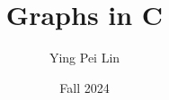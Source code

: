 \documentclass[a4paper,11pt]{article}
\begin{document}
\title{
  \textbf{Graphs in C}
}
\author{Ying Pei Lin}
\date{Fall 2024}

\maketitle

\subsection*{}
\end{document}
